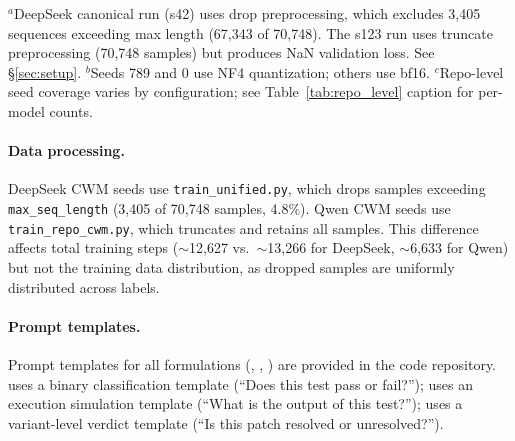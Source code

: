 \begin{table}[h]

\vspace{2pt}
{\footnotesize $^a$DeepSeek \cls{} canonical run (s42) uses drop preprocessing, which excludes 3,405 sequences exceeding max length (67,343 of 70,748). The s123 run uses truncate preprocessing (70,748 samples) but produces NaN validation loss. See \S\ref{sec:setup}. $^b$Seeds 789 and 0 use NF4 quantization; others use bf16. $^c$Repo-level seed coverage varies by configuration; see Table~\ref{tab:repo_level} caption for per-model counts.}
\end{table}

\paragraph{Data processing.} DeepSeek CWM seeds use \texttt{train\_unified.py}, which drops samples exceeding \texttt{max\_seq\_length} (3{,}405 of 70{,}748 samples, 4.8\%). Qwen CWM seeds use \texttt{train\_repo\_cwm.py}, which truncates and retains all samples. This difference affects total training steps (${\sim}$12{,}627 vs.\ ${\sim}$13{,}266 for DeepSeek, ${\sim}$6{,}633 for Qwen) but not the training data distribution, as dropped samples are uniformly distributed across labels.

\paragraph{Prompt templates.} Prompt templates for all formulations (\cls{}, \cwm{}, \traj{}) are provided in the code repository. \cls{} uses a binary classification template (``Does this test pass or fail?''); \cwm{} uses an execution simulation template (``What is the output of this test?''); \traj{} uses a variant-level verdict template (``Is this patch resolved or unresolved?'').

